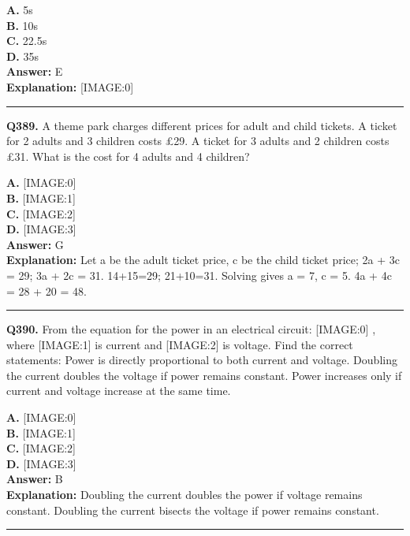 \documentclass[12pt]{article}
\begin{document}
\textbf{A.} 5s \\
\textbf{B.} 10s \\
\textbf{C.} 22.5s \\
\textbf{D.} 35s \\

\textbf{Answer:} E \\
\textbf{Explanation:} [IMAGE:0]

\hrule
\vspace{1em}


\noindent
\textbf{Q389.} A theme park charges different prices for adult and child tickets.
A ticket for 2 adults and 3 children costs £29.
A ticket for 3 adults and 2 children costs £31.
What is the cost for 4 adults and 4 children?



\textbf{A.} [IMAGE:0] \\
\textbf{B.} [IMAGE:1] \\
\textbf{C.} [IMAGE:2] \\
\textbf{D.} [IMAGE:3] \\

\textbf{Answer:} G \\
\textbf{Explanation:} Let a be the adult ticket price, c be the child ticket price;
2a + 3c = 29; 3a + 2c = 31.
14+15=29; 21+10=31.
Solving gives a = 7, c = 5.
4a + 4c = 28 + 20 = 48.

\hrule
\vspace{1em}


\noindent
\textbf{Q390.} From the equation for the power in an electrical circuit:
[IMAGE:0]
, where
[IMAGE:1]
is current and
[IMAGE:2]
is voltage. Find the correct statements:
Power is directly proportional to both current and voltage.
Doubling the current doubles the voltage if power remains constant.
Power increases only if current and voltage increase at the same time.



\textbf{A.} [IMAGE:0] \\
\textbf{B.} [IMAGE:1] \\
\textbf{C.} [IMAGE:2] \\
\textbf{D.} [IMAGE:3] \\

\textbf{Answer:} B \\
\textbf{Explanation:} Doubling the current doubles the power if voltage remains constant. Doubling the current bisects the voltage if power remains constant.

\hrule
\vspace{1em}
\end{document}

